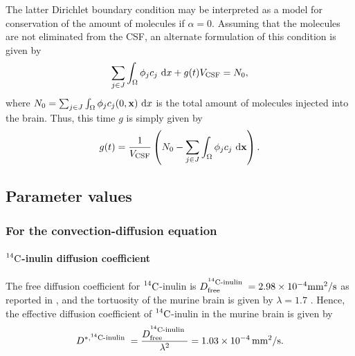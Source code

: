 \documentclass[10pt,letterpaper]{article}
\newcommand{\1}{^{(1)}}
\newcommand{\2}{^{(2)}}
\newcommand*{\dd}{\mathop{\kern0pt\mathrm{d}}\!{}}
\newcommand {\x}   {\mathbf{x}}
\newcommand{\Cinulin}{$\prescript{14}{}{\text{C}}$-inulin }
\newtheorem{remark}[theorem]{Remark}
\begin{document}
The latter Dirichlet boundary condition may be interpreted as a model for conservation of the amount of molecules if $\alpha =0$. Assuming that the molecules are not eliminated from the CSF, an alternate formulation of this condition is given by
\begin{equation}
    \sum_{j\in J} \int_\Omega  \phi_j c_j \,\dd x + g(t) V_{\text{CSF}} = N_0,
    \label{eq:inulin-tracer-conservation}
\end{equation}
where $N_0 = \sum_{j\in J} \int_\Omega  \phi_j c_j(0,\x) \,\dd x $ is the total amount of molecules injected into the brain. Thus, this time $g$ is simply given by 
\begin{equation}
    g(t) = \frac{1}{ V_{\text{CSF}}}\left( N_0  - \sum_{j\in J} \int_\Omega  \phi_j c_j \,\dd \x \right) .
    \label{eq:g-conservation}
\end{equation}





\subsection{Parameter values}
\label{subsec:para-values}

\subsubsection{For the convection-diffusion equation}

\paragraph{\Cinulin diffusion coefficient}
The free diffusion coefficient for \Cinulin is $ D_\text{free}^\text{\Cinulin} = 2.98 \times 10^{-4} \text{mm}^2/ \text{s} $ as reported in \cite{lanman1971diffusion}, and the tortuosity of the murine brain is given by $ \lambda=1.7 $ \cite{Waters-2011-AB}. Hence, the effective diffusion coefficient of \Cinulin in the murine brain is given by
\[ 
  D^{*,\text{\Cinulin}} = \frac{D_\text{free}^\text{\Cinulin}}{\lambda^2} = 1.03\times 10^{-4} \, \text{mm}^2/ \text{s}.
\]
\end{document}

